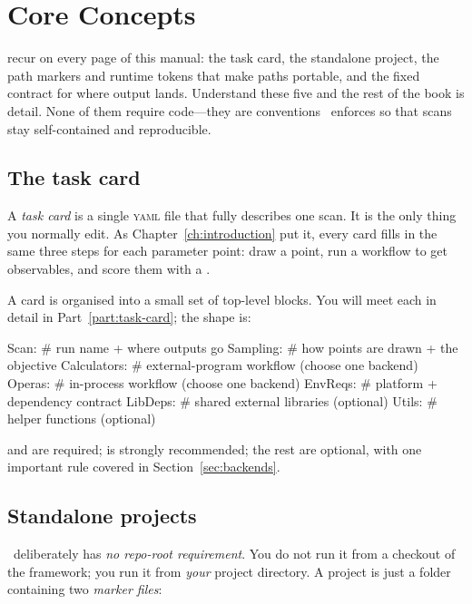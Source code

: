 \chapter{Core Concepts}
\label{ch:core-concepts}

 recur on every page of this manual: the task card, the
standalone project, the path markers and runtime tokens that make paths portable, and the
fixed contract for where output lands. Understand these five and the rest of the book is
detail. None of them require code---they are conventions \Jarvis\ enforces so that scans stay
self-contained and reproducible.

\section{The task card}
\label{sec:task-card}

A \emph{task card} is a single \textsc{yaml} file that fully describes one scan. It is the only
thing you normally edit. As Chapter~\ref{ch:introduction} put it, every card fills in the same
three steps for each parameter point: draw a point, run a workflow to get observables, and
score them with a .

A card is organised into a small set of top-level blocks. You will meet each in detail in
Part~\ref{part:task-card}; the shape is:

\begin{yamlwin}
Scan:         # run name + where outputs go
Sampling:     # how points are drawn + the objective
Calculators:  # external-program workflow   (choose one backend)
Operas:       # in-process workflow         (choose one backend)
EnvReqs:      # platform + dependency contract
LibDeps:      # shared external libraries (optional)
Utils:        # helper functions (optional)
\end{yamlwin}

\noindent {} and  are required;  is strongly
recommended; the rest are optional, with one important rule covered in
Section~\ref{sec:backends}.

\section{Standalone projects}
\label{sec:standalone-projects}

\Jarvis\ deliberately has \emph{no repo-root requirement}. You do not run it from a checkout of
the framework; you run it from \emph{your} project directory. A project is just a folder
containing two \emph{marker files}:

